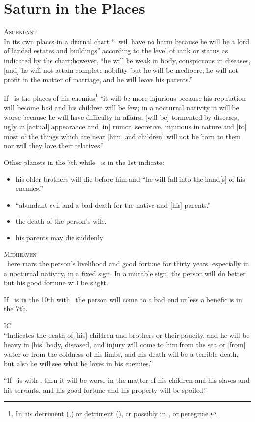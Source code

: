 \section{Saturn in the Places}
\textsc{Ascendant} \hfill \\
\indent In its own places in a diurnal chart ``\Saturn\, will have no harm because he will be a lord of landed estates and buildings'' according to the level of rank or status as indicated by the chart;however, ``he will be weak in body, conspicuous in diseases, [and] he will not attain complete nobility, but he will be mediocre, he will not profit in the matter of marriage, and he will leave his parents.''

If \Saturn\, is the places of his enemies\footnote{In his detriment (\Cancer,\Leo) or detriment (\Aries), or possibly in \Scorpio, or peregrine.} ``it will be more injurious because his reputation will become bad and his children will be few; in a nocturnal nativity it will be worse because he will have difficulty in affairs, [will be] tormented by diseases, ugly in [actual] appearance and [in] rumor, secretive, injurious in nature and [to] most of the things which are near [him, and children] will not be born to them nor will they love their relatives.''

Other planets in the 7th while \Saturn\, is in the 1st indicate:
\begin{itemize}[topsep=0em,itemsep=0em]
\item[\Jupiter] his older brothers will die before him and ``he will fall into the hand[s] of his enemies.''

\item[\Mars] ``abundant evil and a bad death for the native and [his] parents.''

\item[\Venus] the death of the person's wife.

\item[\Mercury] his parents may die suddenly
\end{itemize}

\noindent\textsc{Midheaven} \hfill \\
\indent\Saturn\, here mars the person's livelihood and good fortune for thirty years, especially in a nocturnal nativity, in a fixed sign. In a mutable sign, the person will do better but his good fortune will be slight. 

If \Saturn\, is in the 10th with \Mars\, the person will come to a bad end unless a benefic is in the 7th.

\vspace{0.5em}
\noindent\textsc{IC} \hfill \\
\indent ``Indicates the death of [his] children and brothers or their paucity, and he will be heavy in [his] body, diseased, and injury will come to him from the sea or [from] water or from the coldness of his limbs, and his death will be a terrible death, but also he will see what he loves in his enemies.''

``If \Mercury\, is with \Saturn, then it will be worse in the matter of his children and his slaves and his servants, and his good fortune and his property will be spoiled.''
